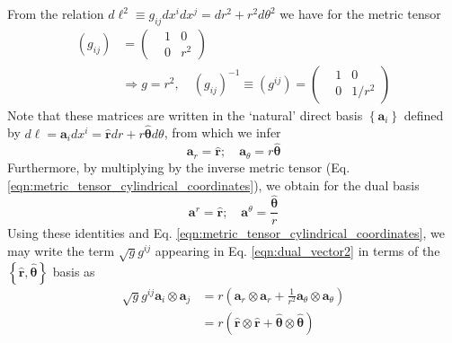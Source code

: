 \documentclass[%
 reprint,
superscriptaddress,
longbibliography,
 amsmath,amssymb,
 prl,
 citeautoscript,
]{revtex4-1}
\begin{document}
From the relation $d \ell^2 \equiv g_{ij} dx^i dx^j = dr^2 + r^2 d\theta^2$ we have for the metric tensor
\begin{equation}
\begin{split}
\left( g_{ij} \right) &=
\begin{pmatrix}
&1 &0 \\
&0 &r^2
\end{pmatrix} \\
&\Longrightarrow g = r^2, \quad \left( g_{ij} \right)^{-1} \equiv \left( g^{ij} \right) =
\begin{pmatrix}
&1 &0 \\
&0 &1/r^2
\end{pmatrix}
\end{split}
\label{eqn:metric_tensor_cylindrical_coordinates}
\end{equation}
Note that these matrices are written in the `natural' direct basis $\left\{ {\boldsymbol a}_i \right\}$ defined by $d {\boldsymbol \ell} = {\boldsymbol a}_i dx^i = \hat{\boldsymbol r} dr + r \hat{\boldsymbol \theta} d\theta$, from which we infer
\begin{equation}
{\boldsymbol a}_r = \hat{\boldsymbol r}; \quad {\boldsymbol a}_{\theta} = r \hat{\boldsymbol \theta}
\label{eqn:covariant_basis}
\end{equation}
Furthermore, by multiplying by the inverse metric tensor (Eq. \ref{eqn:metric_tensor_cylindrical_coordinates}), we obtain for the dual basis
\begin{equation}
{\boldsymbol a}^r = \hat{\boldsymbol r}; \quad {\boldsymbol a}^{\theta} = \frac{\hat{\boldsymbol \theta}}{r}
\label{eqn:contravariant_basis}
\end{equation}
Using these identities and Eq. \ref{eqn:metric_tensor_cylindrical_coordinates}, we may write the term $\sqrt{g} g^{ij}$ appearing in Eq. \ref{eqn:dual_vector2} in terms of the $\left\{ \hat{\boldsymbol r}, \hat{\boldsymbol \theta} \right\}$ basis as
\begin{equation}
\begin{split}
\sqrt{g} g^{ij} {\boldsymbol a}_i \otimes {\boldsymbol a}_j &= r \left( {\boldsymbol a}_r \otimes {\boldsymbol a}_r + \frac{1}{r^2} {\boldsymbol a}_{\theta} \otimes {\boldsymbol a}_{\theta} \right) \\
&= r \left( \hat{\boldsymbol r} \otimes \hat{\boldsymbol r} + \hat{\boldsymbol \theta} \otimes \hat{\boldsymbol \theta} \right)
\end{split}
\label{eqn:ggij2}
\end{equation}
\end{document}
